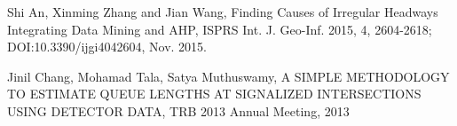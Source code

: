 \documentclass[12pt]{report}
\begin{document}
\begin{thebibliography}{9}
Shi An, Xinming Zhang and Jian Wang, Finding Causes of Irregular Headways Integrating Data Mining and AHP, ISPRS Int. J. Geo-Inf. 2015, 4, 2604-2618; DOI:10.3390/ijgi4042604, Nov. 2015.

Jinil Chang, Mohamad Tala, Satya Muthuswamy, A SIMPLE METHODOLOGY TO ESTIMATE QUEUE LENGTHS AT SIGNALIZED INTERSECTIONS USING DETECTOR DATA, TRB 2013 Annual Meeting, 2013




\end{thebibliography}
\end{document}
